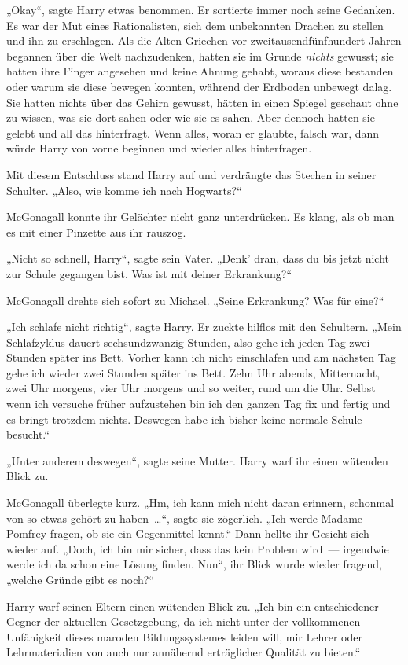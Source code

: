 {„Okay“, sagte Harry etwas benommen. Er sortierte immer noch seine Gedanken. Es war der Mut eines Rationalisten, sich dem unbekannten Drachen zu stellen und ihn zu erschlagen. Als die Alten Griechen vor zweitausendfünfhundert Jahren begannen über die Welt nachzudenken, hatten sie im Grunde \emph{nichts} gewusst; sie hatten ihre Finger angesehen und keine Ahnung gehabt, woraus diese bestanden oder warum sie diese bewegen konnten, während der Erdboden unbewegt dalag. Sie hatten nichts über das Gehirn gewusst, hätten in einen Spiegel geschaut ohne zu wissen, was sie dort sahen oder wie sie es sahen. Aber dennoch hatten sie gelebt und all das hinterfragt. Wenn alles, woran er glaubte, falsch war, dann würde Harry von vorne beginnen und wieder alles hinterfragen.

Mit diesem Entschluss stand Harry auf und verdrängte das Stechen in seiner Schulter. „Also, wie komme ich nach Hogwarts?“

McGonagall konnte ihr Gelächter nicht ganz unterdrücken. Es klang, als ob man es mit einer Pinzette aus ihr rauszog.

„Nicht so schnell, Harry“, sagte sein Vater. „Denk' dran, dass du bis jetzt nicht zur Schule gegangen bist. Was ist mit deiner Erkrankung?“

McGonagall drehte sich sofort zu Michael. „Seine Erkrankung? Was für eine?“

„Ich schlafe nicht richtig“, sagte Harry. Er zuckte hilflos mit den Schultern. „Mein Schlafzyklus dauert sechsundzwanzig Stunden, also gehe ich jeden Tag zwei Stunden später ins Bett. Vorher kann ich nicht einschlafen und am nächsten Tag gehe ich wieder zwei Stunden später ins Bett. Zehn Uhr abends, Mitternacht, zwei Uhr morgens, vier Uhr morgens und so weiter, rund um die Uhr. Selbst wenn ich versuche früher aufzustehen bin ich den ganzen Tag fix und fertig und es bringt trotzdem nichts. Deswegen habe ich bisher keine normale Schule besucht.“

„Unter anderem deswegen“, sagte seine Mutter. Harry warf ihr einen wütenden Blick zu.

McGonagall überlegte kurz. „Hm, ich kann mich nicht daran erinnern, schonmal von so etwas gehört zu haben~…“, sagte sie zögerlich. „Ich werde Madame Pomfrey fragen, ob sie ein Gegenmittel kennt.“ Dann hellte ihr Gesicht sich wieder auf. „Doch, ich bin mir sicher, dass das kein Problem wird~— irgendwie werde ich da schon eine Lösung finden. Nun“, ihr Blick wurde wieder fragend, „welche Gründe gibt es noch?“

Harry warf seinen Eltern einen wütenden Blick zu. „Ich bin ein entschiedener Gegner der aktuellen Gesetzgebung, da ich nicht unter der vollkommenen Unfähigkeit dieses maroden Bildungssystemes leiden will, mir Lehrer oder Lehrmaterialien von auch nur annähernd erträglicher Qualität zu bieten.“

}
